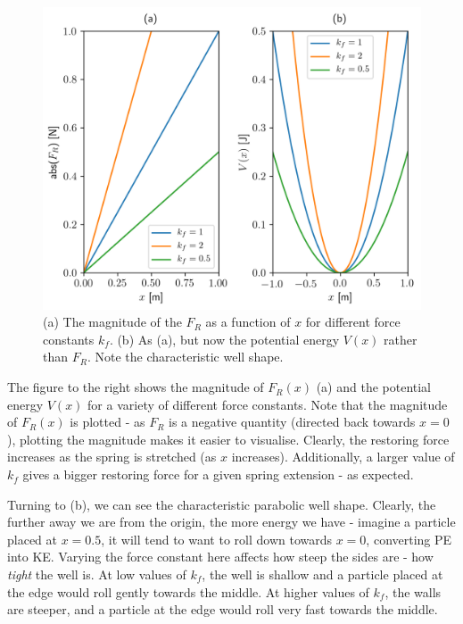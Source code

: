 \documentclass{memoir}[11pt,oneside,a4paper,openany]
\begin{document}
\begin{figure}
	\vspace{-0.5cm}
	\centering
	\includegraphics[width=\linewidth]{harmonic_well}
	\caption{(a) The magnitude of the $F_R$ as a function of $x$ for different force constants $k_f$. (b) As (a), but now the potential energy $V(x)$ rather than $F_R$. Note the characteristic well shape.}\label{fig:harmonic_potential}
\end{figure}

The figure to the right shows the magnitude of $F_R(x)$ (a) and the potential energy $V(x)$ for a variety of different force constants. Note that the magnitude of $F_R(x)$ is plotted - as $F_R$ is a negative quantity (directed back towards $x=0$), plotting the magnitude makes it easier to visualise. Clearly, the restoring force increases as the spring is stretched (as $x$ increases). Additionally, a larger value of $k_f$ gives a bigger restoring force for a given spring extension - as expected. 

Turning to (b), we can see the characteristic parabolic well shape. Clearly, the further away we are from the origin, the more energy we have - imagine a particle placed at $x=0.5$, it will tend to want to roll down towards $x=0$, converting PE into KE. Varying the force constant here affects how steep the sides are - how \emph{tight} the well is. At low values of $k_f$, the well is shallow and a particle placed at the edge would roll gently towards the middle. At higher values of $k_f$, the walls are steeper, and a particle at the edge would roll very fast towards the middle. 
\end{document}
